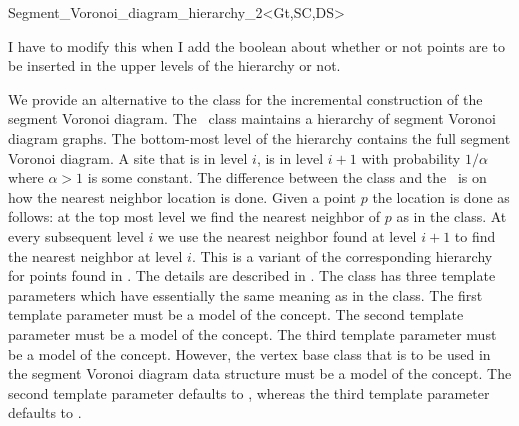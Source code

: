 
\begin{ccRefClass}{Segment_Voronoi_diagram_hierarchy_2<Gt,SC,DS>}

{\sc I have to modify this when I add the boolean about whether or not
  points are to be inserted in the upper levels of the hierarchy or
  not.}

\ccDefinition

We provide an alternative to the class
 for the incremental
construction of the segment Voronoi diagram. The \ccRefName\ class
maintains a hierarchy of segment Voronoi diagram graphs. The
bottom-most level of the hierarchy contains the full segment Voronoi
diagram. A site that is in level $i$, is in level $i+1$ with
probability $1/\alpha$ where $\alpha > 1$ is some constant. The
difference between the  class
and the \ccRefName\ is on how the nearest neighbor location is
done. Given a point $p$ the location is done as follows: at the top
most level we find the nearest neighbor of $p$ as in the
 class. At every subsequent
level $i$ we use the nearest neighbor found at level $i+1$ to find the
nearest neighbor at level $i$. This is a variant of the corresponding
hierarchy for points found in \cite{d-iirdt-98}. The details are
described in \cite{k-peasv-04}.
%
The class has three template parameters which have essentially the same
meaning as in the  class. The
first template parameter must be a model of the
 concept.
The second template parameter must be a model of the
 concept. The third template parameter must be a
model of the 
concept. However, the vertex base class that is to be used in the
segment Voronoi diagram data structure must
be a model of the 
concept. The second template parameter defaults to
, whereas the third
template parameter defaults to
. 


\end{ccRefClass}
